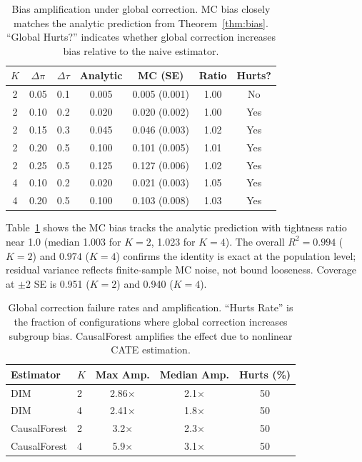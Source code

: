\documentclass[11pt,twocolumn]{article}
\begin{document}
\begin{table}[t]
\centering
\caption{Bias amplification under global correction. MC bias closely matches the analytic prediction from Theorem~\ref{thm:bias}. ``Global Hurts?'' indicates whether global correction increases bias relative to the naive estimator.}
\label{tab:bias_amplification}
\small
\begin{tabular}{@{}ccccccc@{}}
\toprule
$K$ & $\Delta\pi$ & $\Delta\tau$ & Analytic & MC (SE) & Ratio & Hurts? \\
\midrule
2 & 0.05 & 0.1 & 0.005 & 0.005 (0.001) & 1.00 & No \\
2 & 0.10 & 0.2 & 0.020 & 0.020 (0.002) & 1.00 & Yes \\
2 & 0.15 & 0.3 & 0.045 & 0.046 (0.003) & 1.02 & Yes \\
2 & 0.20 & 0.5 & 0.100 & 0.101 (0.005) & 1.01 & Yes \\
2 & 0.25 & 0.5 & 0.125 & 0.127 (0.006) & 1.02 & Yes \\
4 & 0.10 & 0.2 & 0.020 & 0.021 (0.003) & 1.05 & Yes \\
4 & 0.20 & 0.5 & 0.100 & 0.103 (0.008) & 1.03 & Yes \\
\bottomrule
\end{tabular}
\end{table}

Table~\ref{tab:bias_amplification} shows the MC bias tracks the analytic prediction with tightness ratio near 1.0 (median 1.003 for $K\!=\!2$, 1.023 for $K\!=\!4$). The overall $R^2 = 0.994$ ($K\!=\!2$) and $0.974$ ($K\!=\!4$) confirms the identity is exact at the population level; residual variance reflects finite-sample MC noise, not bound looseness. Coverage at $\pm 2$ SE is 0.951 ($K\!=\!2$) and 0.940 ($K\!=\!4$).

\begin{table}[t]
\centering
\caption{Global correction failure rates and amplification. ``Hurts Rate'' is the fraction of configurations where global correction increases subgroup bias. CausalForest amplifies the effect due to nonlinear CATE estimation.}
\label{tab:hurts_summary}
\small
\begin{tabular}{@{}llccc@{}}
\toprule
Estimator & $K$ & Max Amp. & Median Amp. & Hurts (\%) \\
\midrule
DIM & 2 & 2.86$\times$ & 2.1$\times$ & 50 \\
DIM & 4 & 2.41$\times$ & 1.8$\times$ & 50 \\
CausalForest & 2 & 3.2$\times$ & 2.3$\times$ & 50 \\
CausalForest & 4 & 5.9$\times$ & 3.1$\times$ & 50 \\
\bottomrule
\end{tabular}
\end{table}
\end{document}
